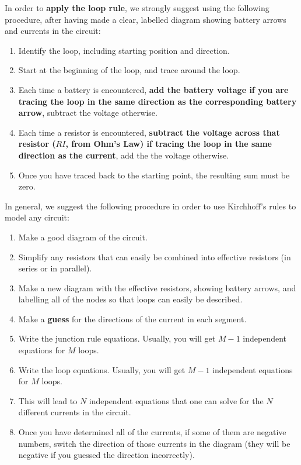 In order to \textbf{apply the loop rule}, we strongly suggest using the following procedure, after having made a clear, labelled diagram showing battery arrows and currents in the circuit:

\begin{enumerate}
\item Identify the loop, including starting position and direction.
\item Start at the beginning of the loop, and trace around the loop.
\item Each time a battery is encountered, \textbf{add the battery voltage if you are tracing the loop in the same direction as the corresponding battery arrow}, subtract the voltage otherwise.
\item Each time a resistor is encountered, \textbf{subtract the voltage across that resistor ($RI$, from Ohm's Law) if tracing the loop in the same direction as the current}, add the the voltage otherwise.
\item Once you have traced back to the starting point, the resulting sum must be zero.
\end{enumerate}

In general, we suggest the following procedure in order to use Kirchhoff's rules to model any circuit:

\begin{enumerate}
\item Make a good diagram of the circuit.
\item Simplify any resistors that can easily be combined into effective resistors (in series or in parallel).
\item Make a new diagram with the effective resistors, showing battery arrows, and labelling all of the nodes so that loops can easily be described.
\item Make a \textbf{guess} for the directions of the current in each segment.
\item Write the junction rule equations. Usually, you will get $M -1$ independent equations for $M$ loops.
\item Write the loop equations. Usually, you will get $M -1$ independent equations for $M$ loops.
\item This will lead to $N$ independent equations that one can solve for the $N$ different currents in the circuit.
\item Once you have determined all of the currents, if some of them are negative numbers, switch the direction of those currents in the diagram (they will be negative if you guessed the direction incorrectly).
\end{enumerate}

